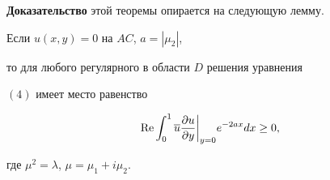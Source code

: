 {\bf Доказательство} этой теоремы опирается на следующую лемму.





\begin{lem}


Если $u(x,y)=0$ на $AC$, $a=|\mu_2|$,


то для любого регулярного в области $D$ решения уравнения


$(4)$ имеет место равенство


\begin{equation}


\re\int_0^1\overline u 


\frac{\partial u}{\partial y}\bigg|_{y=0}


e^{-2ax}dx\ge 0,


\end{equation}


где $\mu ^2=\lambda$, $\mu =\mu_1+i\mu_2$.


\end{lem}





